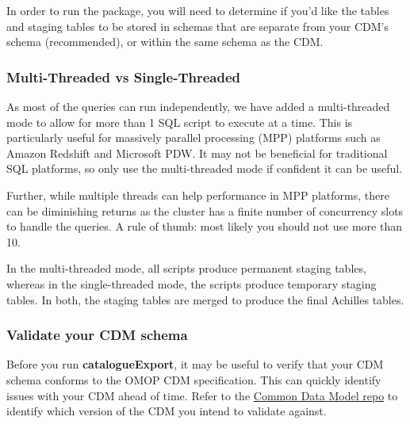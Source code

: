\documentclass[
]{article}
\begin{document}
In order to run the package, you will need to determine if you'd like
the tables and staging tables to be stored in schemas that are separate
from your CDM's schema (recommended), or within the same schema as the
CDM.

\hypertarget{multi-threaded-vs-single-threaded}{%
\subsubsection{Multi-Threaded vs
Single-Threaded}\label{multi-threaded-vs-single-threaded}}

As most of the queries can run independently, we have added a
multi-threaded mode to allow for more than 1 SQL script to execute at a
time. This is particularly useful for massively parallel processing
(MPP) platforms such as Amazon Redshift and Microsoft PDW. It may not be
beneficial for traditional SQL platforms, so only use the multi-threaded
mode if confident it can be useful.

Further, while multiple threads can help performance in MPP platforms,
there can be diminishing returns as the cluster has a finite number of
concurrency slots to handle the queries. A rule of thumb: most likely
you should not use more than 10.

In the multi-threaded mode, all scripts produce permanent staging
tables, whereas in the single-threaded mode, the scripts produce
temporary staging tables. In both, the staging tables are merged to
produce the final Achilles tables.

\hypertarget{validate-your-cdm-schema}{%
\subsubsection{Validate your CDM
schema}\label{validate-your-cdm-schema}}

Before you run \textbf{catalogueExport}, it may be useful to verify that
your CDM schema conforms to the OMOP CDM specification. This can quickly
identify issues with your CDM ahead of time. Refer to the
\href{https://github.com/OHDSI/CommonDataModel}{Common Data Model repo}
to identify which version of the CDM you intend to validate against.
\end{document}
